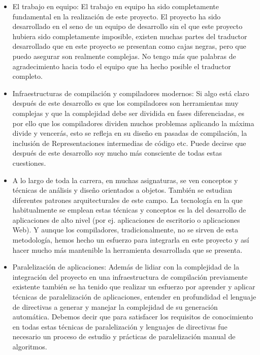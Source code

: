 \begin{itemize}

\item El trabajo en equipo: El trabajo en equipo ha sido completamente fundamental en la realización de este proyecto. El proyecto ha sido desarrollado en el seno de un equipo de desarrollo sin el que este proyecto hubiera sido completamente imposible, existen muchas partes del traductor desarrollado que en este proyecto se presentan como cajas negras, pero que puedo asegurar son realmente complejas.
No tengo más que palabras de agradecimiento hacia todo el equipo que ha hecho posible el traductor completo.

\item Infraestructuras de compilación y compiladores modernos: Si algo está claro después de este desarrollo es que los compiladores son herramientas muy complejas y que la complejidad debe ser dividida en fases diferenciadas, es por ello que los compiladores dividen muchos problemas aplicando la máxima divide y vencerás, esto se refleja en su diseño en pasadas de compilación, la inclusión de Representaciones intermedias de código etc. Puede decirse que después de este desarrollo soy mucho más consciente de todas estas cuestiones.

\item A lo largo de toda la carrera, en muchas asignaturas, se ven conceptos y técnicas de análisis y diseño orientados a objetos. También se estudian diferentes patrones arquitecturales de este campo. La tecnología en la que habitualmente se emplean estas técnicas y conceptos es la del desarrollo de aplicaciones de alto nivel (por ej. aplicaciones de escritorio o aplicaciones Web). Y aunque los compiladores, tradicionalmente, no se sirven de esta metodología, hemos hecho un esfuerzo para integrarla en este proyecto y así hacer mucho más mantenible la herramienta desarrollada que se presenta. 

\item Paralelización de aplicaciones: Además de lidiar con la complejidad de la integración del proyecto en una infraestructura de compilación previamente existente también se ha tenido que realizar un esfuerzo por aprender y aplicar técnicas de paralelización de aplicaciones, entender en profundidad el lenguaje de directivas a generar y manejar la complejidad de su generación automática. Debemos decir que para satisfacer los requisitos de conocimiento en todas estas técnicas de paralelización y lenguajes de directivas fue necesario un proceso de estudio y prácticas de paralelización manual de algoritmos.

\end{itemize}



